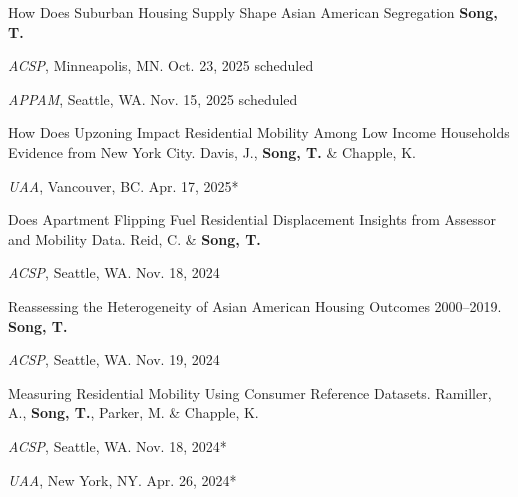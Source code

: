 \documentclass[10pt,letterpaper]{article}
\newcommand{\listitemspace}{0.25em}
\renewenvironment{itemize}
{\begin{list}{}{\setlength{\leftmargin}{1em}
\setlength{\parskip}{0em}
\setlength{\itemsep}{\listitemspace}
\setlength{\parsep}{\listitemspace}}}
{\end{list}}
\begin{document}
\begin{itemize}
  \item How Does Suburban Housing Supply Shape Asian American Segregation \textbf{Song, T.}
    \begin{itemize}
      \addtolength{\leftskip}{1em}
      \setlength{\itemsep}{-0.4em}
      \item[•] \emph{ACSP}, Minneapolis, MN. Oct. 23, 2025 scheduled
      \item[•] \emph{APPAM}, Seattle, WA. Nov. 15, 2025 scheduled
    \end{itemize}

  \item How Does Upzoning Impact Residential Mobility Among Low Income Households Evidence from New York City. Davis, J., \textbf{Song, T.} \& Chapple, K.
    \begin{itemize}
      \addtolength{\leftskip}{1em}
      \setlength{\itemsep}{-0.4em}
      \item[•] \emph{UAA}, Vancouver, BC. Apr. 17, 2025*
    \end{itemize}

  \item Does Apartment Flipping Fuel Residential Displacement Insights from Assessor and Mobility Data. Reid, C. \& \textbf{Song, T.}
    \begin{itemize}
      \addtolength{\leftskip}{1em}
      \setlength{\itemsep}{-0.4em}
      \item[•] \emph{ACSP}, Seattle, WA. Nov. 18, 2024
    \end{itemize}

  \item Reassessing the Heterogeneity of Asian American Housing Outcomes 2000–2019. \textbf{Song, T.}
    \begin{itemize}
      \addtolength{\leftskip}{1em}
      \setlength{\itemsep}{-0.4em}
      \item[•] \emph{ACSP}, Seattle, WA. Nov. 19, 2024
    \end{itemize}

  \item Measuring Residential Mobility Using Consumer Reference Datasets. Ramiller, A., \textbf{Song, T.}, Parker, M. \& Chapple, K.
    \begin{itemize}
      \addtolength{\leftskip}{1em}
      \setlength{\itemsep}{-0.4em}
      \item[•] \emph{ACSP}, Seattle, WA. Nov. 18, 2024*
      \item[•] \emph{UAA}, New York, NY. Apr. 26, 2024*
    \end{itemize}


\end{itemize}
\end{document}
